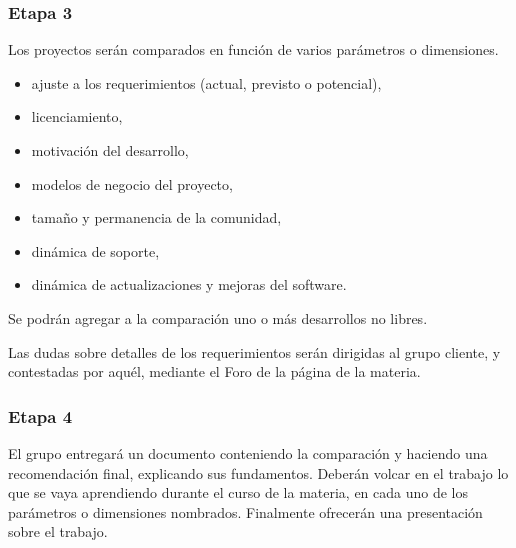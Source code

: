 \subsubsection{Etapa 3}
Los proyectos serán comparados en función de varios parámetros o dimensiones.
\begin{itemize}
	\item  ajuste a los requerimientos (actual, previsto o potencial),
	\item  licenciamiento, 
	\item  motivación del desarrollo, 
	\item  modelos de negocio del proyecto, 
	\item  tamaño y permanencia de la comunidad,
	\item  dinámica de soporte, 
	\item  dinámica de actualizaciones y mejoras del software.
\end{itemize}

Se podrán agregar a la comparación uno o más desarrollos no libres. 

Las dudas sobre detalles de los requerimientos serán dirigidas al grupo cliente, y contestadas por aquél, mediante el Foro de la página de la materia.  
\subsubsection{Etapa 4} 
El grupo entregará un documento conteniendo la comparación y haciendo una recomendación final, explicando sus fundamentos. Deberán volcar en el trabajo lo que se vaya aprendiendo durante el curso de la materia, en cada uno de los parámetros o dimensiones nombrados. Finalmente ofrecerán una presentación sobre el trabajo.

\label{sub:acreditacion}